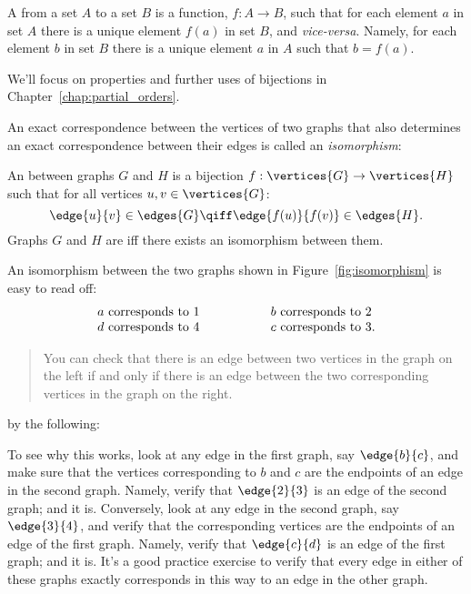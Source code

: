 \begin{definition}
A  from a set $A$ to a set $B$ is a function, $f:A\to B$,
such that for each element $a$ in set $A$ there is a unique
element $f(a)$ in set $B$, and \emph{vice-versa}.  Namely, for each
element $b$ in set $B$ there is a unique element $a$ in
$A$ such that $b = f(a)$.
\end{definition}
We'll focus on properties and further uses of bijections in
Chapter~\ref{chap:partial_orders}.

An exact correspondence between the vertices of two graphs that also
determines an exact correspondence between their edges is called an
\emph{isomorphism}:
\begin{definition}\label{simple-isomorphism}
An  between graphs $G$ and $H$ is a
  bijection $f:\vertices{G} \to
  \vertices{H}$ such that for all vertices $u, v \in
  \vertices{G}$:
\[
\edge{u}{v} \in \edges{G} \qiff \edge{f(u)}{f(v)} \in \edges{H}.
\]
Graphs $G$ and $H$ are  iff there exists an
isomorphism between them.
\end{definition}

An isomorphism between the two graphs shown in
Figure~\ref{fig:isomorphism} is easy to read off:
\[
\begin{array}{lll}
a \text{ corresponds to } 1 & \hspace{0.5in} & b \text{ corresponds to } 2 \\
d \text{ corresponds to } 4 & & c \text{ corresponds to } 3.
\end{array}
\]

\begin{editingnotes}
\begin{quote}
 You can check that there is an edge between two
  vertices in the graph on the left if and only if there is an edge
  between the two corresponding vertices in the graph on the right.
\end{quote}
by the following:
\end{editingnotes}

To see why this works, look at any edge in the first graph, say
$\edge{b}{c}$, and make sure that the vertices corresponding to $b$ and
$c$ are the endpoints of an edge in the second graph.  Namely, verify that
$\edge{2}{3}$ is an edge of the second graph; and it is.  Conversely, look
at any edge in the second graph, say $\edge{3}{4}$, and verify that the
corresponding vertices are the endpoints of an edge of the first
graph. Namely, verify that $\edge{c}{d}$ is an edge of the first graph;
and it is.  It's a good practice exercise to verify that every edge in
either of these graphs exactly corresponds in this way to an edge in the
other graph.

